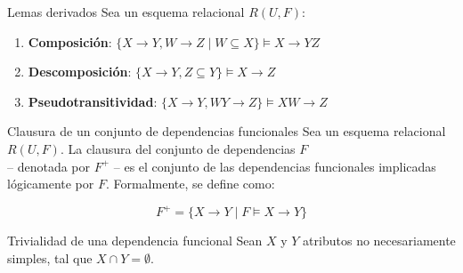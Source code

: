 \begin{frame}{Lemas derivados}
    Sea un esquema relacional $R(U,F)$:
    \begin{enumerate}
        \item \textbf{Composici\'on}: $\{X \to Y, W \to Z \;|\; W \subseteq X\} \models X \to YZ$ 
        \item \textbf{Descomposici\'on}: $\{X \to Y, Z \subseteq Y\} \models X \to Z$
        \item \textbf{Pseudotransitividad}: $\{ X \to Y, WY \to Z \}  \models XW \to Z$
    \end{enumerate}
\end{frame}


\begin{frame}{Clausura de un conjunto de dependencias funcionales}
    Sea un esquema relacional $R(U,F)$. La clausura del conjunto
    de dependencias $F$ \\ -- denotada por $F^+$ -- es el conjunto de las
    dependencias funcionales implicadas l\'ogicamente por $F$. Formalmente,
    se define como:
    
    $$
        F^+=\{ X \to Y \;|\; F \models X \to Y \}
    $$

\end{frame}


\begin{frame}{Trivialidad de una dependencia funcional}    
    Sean $X$ y $Y$ atributos no necesariamente simples, tal que $X \cap Y = \emptyset$.\\[5mm]

    \begin{columns}[t]
        \centering

        \centering

        \centering
    \end{columns}

\end{frame}


